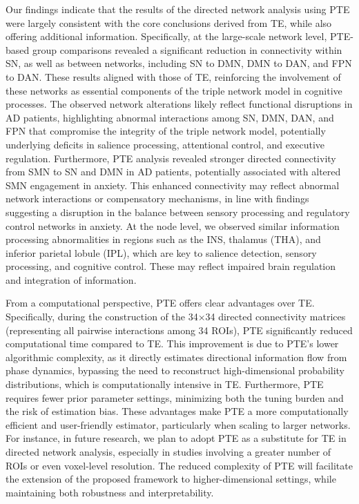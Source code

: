 \documentclass[12pt,technote,onecolumn]{IEEEtran}
\begin{document}
Our findings indicate that the results of the directed network analysis using PTE were largely consistent with the core conclusions derived from TE, while also offering additional information. Specifically, at the large-scale network level, PTE-based group comparisons revealed a significant reduction in connectivity within SN, as well as between networks, including SN to DMN, DMN to DAN, and FPN to DAN. These results aligned with those of TE, reinforcing the involvement of these networks as essential components of the triple network model in cognitive processes. The observed network alterations likely reflect functional disruptions in AD patients, highlighting abnormal interactions among SN, DMN, DAN, and FPN that compromise the integrity of the triple network model, potentially underlying deficits in salience processing, attentional control, and executive regulation.
Furthermore, PTE analysis revealed stronger directed connectivity from SMN to SN and DMN in AD patients, potentially associated with altered SMN engagement in anxiety. This enhanced connectivity may reflect abnormal network interactions or compensatory mechanisms, in line with findings suggesting a disruption in the balance between sensory processing and regulatory control networks in anxiety. At the node level, we observed similar information processing abnormalities in regions such as the INS, thalamus (THA), and inferior parietal lobule (IPL), which are key to salience detection, sensory processing, and cognitive control. These may reflect impaired brain regulation and integration of information.

From a computational perspective, PTE offers clear advantages over TE. Specifically, during the construction of the 34×34 directed connectivity matrices (representing all pairwise interactions among 34 ROIs), PTE significantly reduced computational time compared to TE. This improvement is due to PTE's lower algorithmic complexity, as it directly estimates directional information flow from phase dynamics, bypassing the need to reconstruct high-dimensional probability distributions, which is computationally intensive in TE. Furthermore, PTE requires fewer prior parameter settings, minimizing both the tuning burden and the risk of estimation bias.
These advantages make PTE a more computationally efficient and user-friendly estimator, particularly when scaling to larger networks. For instance, in future research, we plan to adopt PTE as a substitute for TE in directed network analysis, especially in studies involving a greater number of ROIs or even voxel-level resolution. The reduced complexity of PTE will facilitate the extension of the proposed framework to higher-dimensional settings, while maintaining both robustness and interpretability.
\vspace{4mm}
\end{document}
